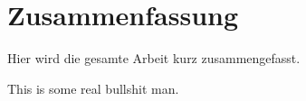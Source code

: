 %
%
%
%

\chapter*{Zusammenfassung}
\label{chap:Zusammen}


Hier wird die gesamte Arbeit kurz zusammengefasst.

This is some real bullshit man.

%

